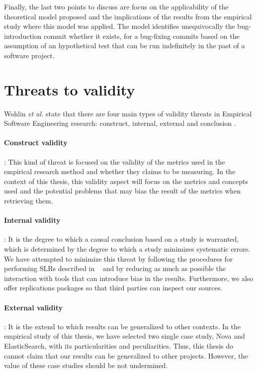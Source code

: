 \documentclass[a4paper, 12pt]{book}
\begin{document}
Finally, the last two points to discuss are focus on the applicability of the theoretical model proposed and the implications of the results from the empirical study where this model was applied. The model identifies unequivocally the bug-introduction commit  whether it exists, for a bug-fixing commits based on the assumption of an hypothetical test that can be run indefinitely in the past of a software project.  

\section{Threats to validity}
\label{sec:threats}

Wohlin \emph{et al.} state that there are four main types of validity threats in Empirical Software Engineering research: construct, internal, external and conclusion \cite{wohlin2012experimentation}.

\paragraph{Construct validity}:  This kind of threat is focused on the validity of the metrics used in the empirical research method and whether they claims to be measuring. In the context of this thesis, this validity aspect will focus on the metrics and concepts used and the potential problems that may bias the result of the metrics when retrieving them.

\paragraph{Internal validity}: It is the degree to which a causal conclusion based on a study is warranted, which is determined by the degree to which a study minimizes systematic errors. We have attempted to minimize this threat by following the procedures for performing SLRs described in ~\cite{madeyski2017would} and by reducing as much as possible the interaction with tools that can introduce bias in the results. Furthermore, we also offer replications packages so that third parties can inspect our sources.

\paragraph{External validity}: It is the extend to which results can be generalized to other contexts. In the empirical study of this thesis, we have selected two single case study, Nova and ElasticSearch, with its particularities and peculiarities. Thus, this thesis do cannot claim that our results can be generalized to other projects. However, the value of these case studies should be not undermined.
 
\end{document}
